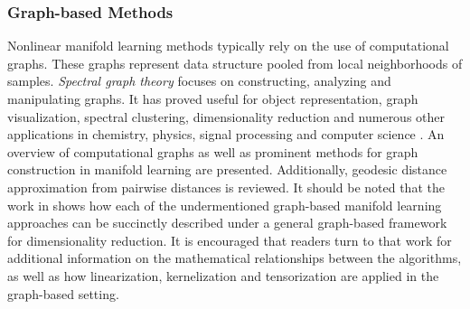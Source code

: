 \subsubsection{Graph-based Methods}
Nonlinear manifold learning methods typically rely on the use of computational graphs.  These graphs represent data structure pooled from local neighborhoods of samples.  \textit{Spectral graph theory} focuses on constructing, analyzing and manipulating graphs.  It has proved useful for object representation, graph visualization, spectral clustering, dimensionality reduction and numerous other applications in chemistry, physics, signal processing and computer science \citep{Shuman2013SignalProcessingGraphs, Bengoetxea2002ThesisGraphMatching}.   An overview of computational graphs as well as prominent methods for graph construction in manifold learning are presented. Additionally, geodesic distance approximation from pairwise distances is reviewed.  It should be noted that the work in \citep{Yan2007GeneralGraphEmbeddingFramework} shows how each of the undermentioned graph-based manifold learning approaches can be succinctly described under a general graph-based framework for dimensionality reduction.  It is encouraged that readers turn to that work for additional information on the mathematical relationships between the algorithms, as well as how linearization, kernelization and tensorization are applied in the graph-based setting.

